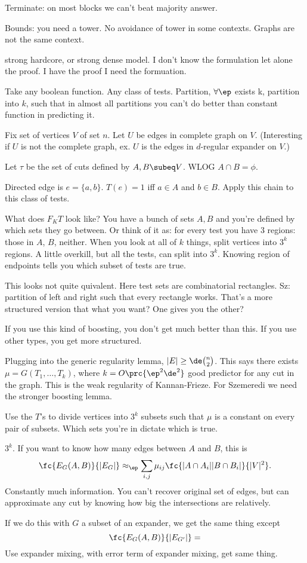 Terminate: on most blocks we can't beat majority answer.

Bounds: you need a tower. No avoidance of tower in some contexts.
Graphs are not the same context.

strong hardcore, or strong dense model. 
I don't know the formulation let alone the proof. I have the proof I need the formuation.

Take any boolean function. Any class of tests. Partition, $\forall \ep$ exists k, partition into $k$, such that in almost all partitions you can't do better than constant function in predicting it.

Fix set of vertices $V$ of set $n$. Let $U$ be edges in complete graph on $V$.
(Interesting if $U$ is not the complete graph, ex. $U$ is the edges in $d$-regular expander on $V$.)

Let $\tau$ be the set of cuts defined by $A,B\subeq V$. WLOG $A\cap B=\phi$.

Directed edge is $e=\{a,b\}$. $T(e) = 1$ iff $a\in A$ and $b\in B$. Apply this chain to this class of tests. 

What does $F_KT$ look like? You have a bunch of sets $A,B$ and you're defined by which sets they go between. Or think of it as: for every test you have 3 regions: those in $A$, $B$, neither. When you look at all of $k$ things, split vertices into $3^k$ regions. A little overkill, but all the tests, can split into $3^k$. Knowing region of endpoints tells you which subset of tests are true. 

This looks not quite quivalent. Here test sets are combinatorial rectangles. Sz: partition of left and right such that every rectangle works. That's a more structured version that what you want?
One gives you the other?

If you use this kind of boosting, you don't get much better than this. If you use other types, you get more structured. 

Plugging into the generic regularity lemma, $|E|\ge \de \binom n2$. This says there exists $\mu=G(T_1,\ldots, T_k)$, where $k=O\prc{\ep^2\de^2}$ good predictor for any cut in the graph. This is the weak regularity of Kannan-Frieze. For Szemeredi we need the stronger boosting lemma.

Use the $T$'s to divide vertices into $3^k$ subsets such that $\mu$ is a constant on every pair of subsets. Which sets you're in dictate which is true. 

$3^k$.  If you want to know how many edges between $A$ and $B$, this is 
$$
\fc{E_G(A,B)}{|E_G|}
\approx_\ep \sum_{i,j} 
\mu_{ij}
\fc{|A\cap A_i||B\cap B_i|}{|V|^2}.
$$
Constantly much information. You can't recover original set of edges, but can approximate any cut by knowing how big the  intersections are relatively.

If we do this with $G$ a subset of an expander, we get the same thing except 
$$
\fc{E_G(A,B)}{|E_{G'}|} = 
$$
Use expander mixing, with error term of expander mixing, get same thing.







